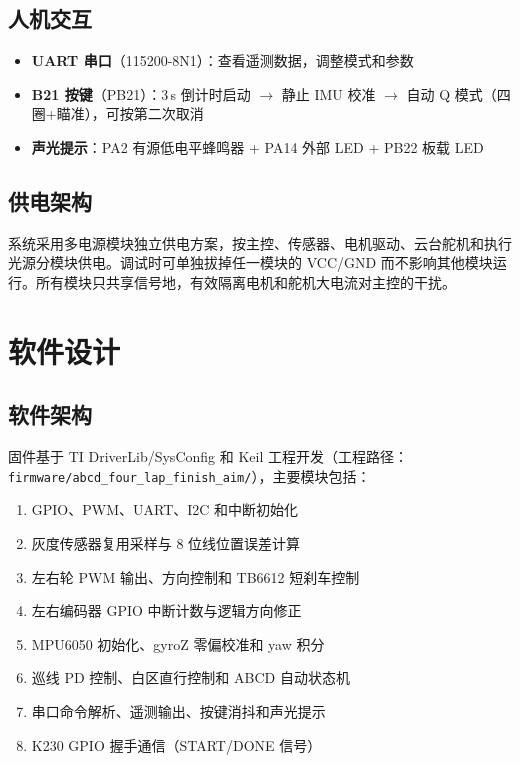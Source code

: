 \documentclass[12pt,a4paper]{ctexart}
\begin{document}
\subsection{人机交互}
\begin{itemize}[nosep]
    \item \textbf{UART 串口}（115200-8N1）：查看遥测数据，调整模式和参数
    \item \textbf{B21 按键}（PB21）：3\,s 倒计时启动 $\rightarrow$ 静止 IMU 校准 $\rightarrow$ 自动 Q 模式（四圈+瞄准），可按第二次取消
    \item \textbf{声光提示}：PA2 有源低电平蜂鸣器 + PA14 外部 LED + PB22 板载 LED
\end{itemize}

\subsection{供电架构}
系统采用多电源模块独立供电方案，按主控、传感器、电机驱动、云台舵机和执行光源分模块供电。调试时可单独拔掉任一模块的 VCC/GND 而不影响其他模块运行。所有模块只共享信号地，有效隔离电机和舵机大电流对主控的干扰。

\section{软件设计}

\subsection{软件架构}
固件基于 TI DriverLib/SysConfig 和 Keil 工程开发（工程路径：\texttt{firmware/abcd\_four\_lap\_finish\_aim/}），主要模块包括：

\begin{enumerate}[nosep]
    \item GPIO、PWM、UART、I2C 和中断初始化
    \item 灰度传感器复用采样与 8 位线位置误差计算
    \item 左右轮 PWM 输出、方向控制和 TB6612 短刹车控制
    \item 左右编码器 GPIO 中断计数与逻辑方向修正
    \item MPU6050 初始化、gyroZ 零偏校准和 yaw 积分
    \item 巡线 PD 控制、白区直行控制和 ABCD 自动状态机
    \item 串口命令解析、遥测输出、按键消抖和声光提示
    \item K230 GPIO 握手通信（START/DONE 信号）
\end{enumerate}
\end{document}
